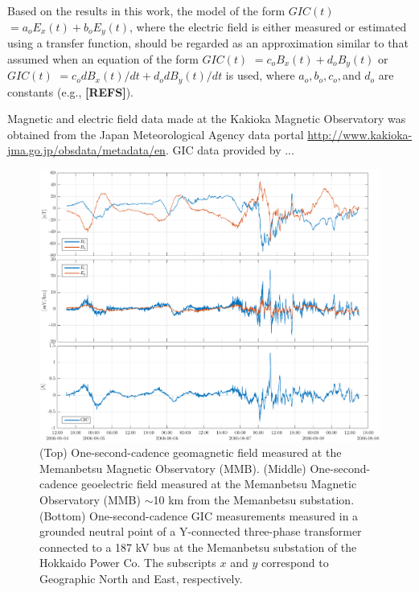 \documentclass[draft,linenumbers]{agujournal2018}
\begin{document}
Based on the results in this work, the model of the form $GIC(t)$ $=a_oE_x(t)+b_oE_y(t)$, where the electric field is either measured or estimated using a transfer function, should be regarded as an approximation similar to that assumed when an equation of the form $GIC(t)$ $=c_oB_x(t)+d_oB_y(t)$ or $GIC(t)$ $=c_odB_x(t)/dt+d_odB_y(t)/dt$ is used, where $a_o, b_o, c_o, $and $d_o$ are constants (e.g., {\color{red} \textbf{[REFS]}}).




\acknowledgments
Magnetic and electric field data made at the Kakioka Magnetic Observatory was obtained from the Japan Meteorological Agency data portal \url{http://www.kakioka-jma.go.jp/obsdata/metadata/en}.  GIC data provided by ...


\begin{figure}[h]
\centering
\includegraphics[width=\textwidth]{figures/plot_raw_All_20060805.pdf}
\caption{(Top) One-second-cadence geomagnetic field measured at the Memanbetsu Magnetic Observatory (MMB). (Middle) One-second-cadence geoelectric field measured at the Memanbetsu Magnetic Observatory (MMB) $\sim$10 km from the Memanbetsu substation. (Bottom) One-second-cadence GIC measurements measured in a grounded neutral point of a Y-connected three-phase transformer connected to a 187 kV bus at the Memanbetsu substation of the Hokkaido Power Co. The subscripts $x$ and $y$ correspond to Geographic North and East, respectively.}
\label{sample}
\end{figure}
\end{document}
